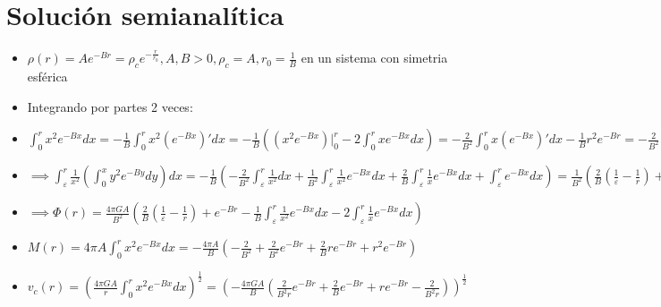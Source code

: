 \documentclass[12pt]{book}
\begin{document}
\clearpage

\section{Solución semianalítica}
\begin{itemize}

\item  $\rho(r) = Ae^{-Br} = \rho_c  e^{-\frac{r}{r_0}}, A,B > 0, \rho_c = A, r_0=\frac{1}{B}$  en un sistema con simetria esférica
\item Integrando por partes 2 veces:
\item $\int_0^r{x^2 e^{-Bx}dx} = - \frac{1}{B} \int_0^r{x^2 (e^{-Bx})\prime dx}
=-\frac{1}{B}( (x^2 e^{-Bx})\Big|_0^r  - 2\int_0^r{x e^{-Bx}dx})  = -\frac{2}{B^2}\int_0^r{x (e^{-Bx})\prime dx} - \frac{1}{B}r^2 e^{-Br} = -\frac{2}{B^2}((x e^{-Bx})\Big|_0^r - \int_0^r{e^{-Bx}dx}) - \frac{1}{B}r^2 e^{-Br} = -\frac{2}{B^3}e^{-Bx}\Big|_0^r -\frac{2}{B^2}r e^{-Br} - \frac{1}{B}r^2 e^{-Br} = \frac{2}{B^3} -\frac{2}{B^3}e^{-Br} -\frac{2}{B^2}r e^{-Br} - \frac{1}{B}r^2 e^{-Br}  $

\item $\implies \int_\varepsilon^r{ \frac{1}{x^2}(\int_0^x{y^2 e^{-By}dy})dx} = 
-\frac{1}{B}(-\frac{2}{B^2}\int_\varepsilon^r{\frac{1}{x^2}dx} +\frac{1}{B^2}\int_\varepsilon^r{\frac{1}{x^2}e^{-Bx}dx}  + \frac{2}{B}\int_\varepsilon^r{\frac{1}{x} e^{-Bx}dx} + \int_\varepsilon^r{e^{-Bx}dx} ) = 
\frac{1}{B^2}(\frac{2}{B}(\frac{1}{\varepsilon} - \frac{1}{r})  + e^{-Br} - \frac{1}{B}\int_\varepsilon^r{\frac{1}{x^2}e^{-Bx}dx} - 2\int_\varepsilon^r{\frac{1}{x} e^{-Bx}dx} ) $

\item $\implies \Phi(r) = \frac{4 \pi G A}{B^2}(\frac{2}{B}(\frac{1}{\varepsilon} - \frac{1}{r}) + e^{-Br} - \frac{1}{B}\int_\varepsilon^r{\frac{1}{x^2}e^{-Bx}dx} - 2\int_\varepsilon^r{\frac{1}{x} e^{-Bx}dx} ) $


\item $M(r) = 4 \pi A \int_0^r{x^2 e^{-Bx}dx} = -\frac{4 \pi A}{B}( -\frac{2}{B^2} + \frac{2}{B^2}e^{-Br} +\frac{2}{B}r e^{-Br} + r^2 e^{-Br}) $

\item $v_c(r) = (\frac{4 \pi G A}{r}\int_0^r{x^2 e^{-Bx}dx} )^{\frac{1}{2}}   
= (-\frac{4 \pi G A}{B}(\frac{2}{B^2r}e^{-Br} +\frac{2}{B} e^{-Br} + r e^{-Br} -  \frac{2}{B^2r} ))^{\frac{1}{2}} $
\end{itemize}
\end{document}
